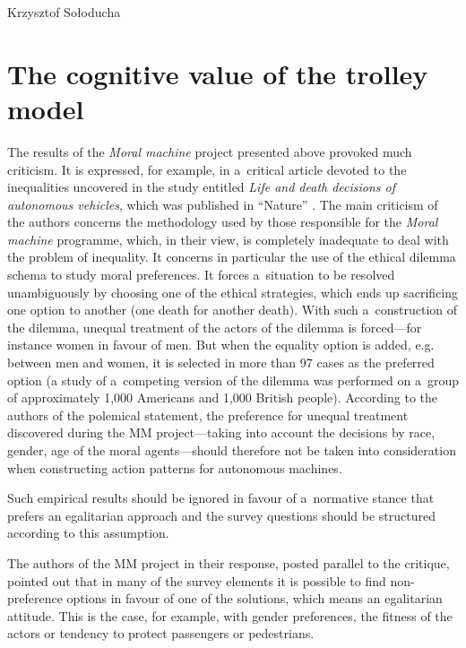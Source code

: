 \begin{artengenv}{Krzysztof Sołoducha}
\section*{The cognitive value of the trolley model}
The results of the \textit{Moral machine} project presented above provoked much criticism. It is expressed, for example, in a~critical article devoted to the inequalities uncovered in the study entitled \textit{Life and death decisions of autonomous vehicles}, which was published in ``Nature''
\parencite[][]{bigman_life_2020}. %
 The main criticism of the authors concerns the methodology used by those responsible for the \textit{Moral machine} programme, which, in their view, is completely inadequate to deal with the problem of inequality. It concerns in particular the use of the ethical dilemma schema to study moral preferences. It forces a~situation to be resolved unambiguously by choosing one of the ethical strategies, which ends up sacrificing one option to another (one death for another death). With such a~construction of the dilemma, unequal treatment of the actors of the dilemma is forced—for instance women in favour of men. But when the equality option is added, e.g. between men and women, it is selected in more than 97 cases as the preferred option (a study of a~competing version of the dilemma was performed on a~group of approximately 1,000 Americans and 1,000 British people). According to the authors of the polemical statement, the preference for unequal treatment discovered during the MM project—taking into account the decisions by race, gender, age of the moral agents—should therefore not be taken into consideration when constructing action patterns for autonomous machines.

Such empirical results should be ignored in favour of a~normative stance that prefers an egalitarian approach and the survey questions should be structured according to this assumption.

The authors of the MM project in their response, posted parallel to the critique, pointed out that in many of the survey elements it is possible to find non-preference options in favour of one of the solutions, which means an egalitarian attitude. This is the case, for example, with gender preferences, the fitness of the actors or tendency to protect passengers or pedestrians.


\end{artengenv}
